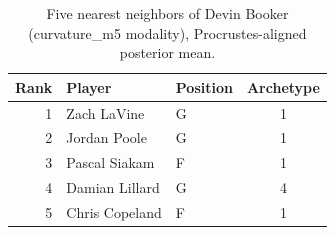 \begin{table}[htbp]
  \centering\small
  \begin{tabular}{rllc}
    \toprule
    Rank & Player & Position & Archetype \\
    \midrule
    1 & Zach LaVine & G & 1 \\
    2 & Jordan Poole & G & 1 \\
    3 & Pascal Siakam & F & 1 \\
    4 & Damian Lillard & G & 4 \\
    5 & Chris Copeland & F & 1 \\
    \bottomrule
  \end{tabular}
  \caption{Five nearest neighbors of Devin Booker (curvature_m5 modality), Procrustes-aligned posterior mean.}
  \label{tab:Devin_Booker_neighbors_curvature_m5}
\end{table}

